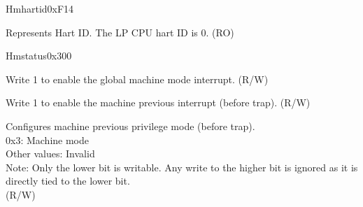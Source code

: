 \begin{register}{H}{mhartid}{0xF14}\label{regdesc:LPMHARTID}
%
\regnewline%
\begin{regdesc}\begin{reglist}
\label{fielddesc:LPMHARTID}\item [MHARTID] Represents Hart ID. The LP CPU hart ID is 0. (RO)
\end{reglist}\end{regdesc}
\end{register}

\begin{register}{H}{mstatus}{0x300}\label{regdesc:LPMSTATUS}
%
%
%
%
%
%
%
%
%
\regnewline%
\begin{regdesc}\begin{reglist}
\label{fielddesc:LPMSTATUSMIE}\item [MIE] Write 1 to enable the global machine mode interrupt. (R/W)
\label{fielddesc:LPMSTATUSMPIE}\item [MPIE] Write 1 to enable the machine previous interrupt (before trap). (R/W)
\label{fielddesc:LPMSTATUSMPP}\item [MPP] Configures machine previous privilege mode (before trap).\\
0x3: Machine mode\\
Other values: Invalid\\
Note: Only the lower bit is writable. Any write to the higher bit is ignored as it is directly tied to the lower bit.\\
(R/W)
\end{reglist}\end{regdesc}
\end{register}

